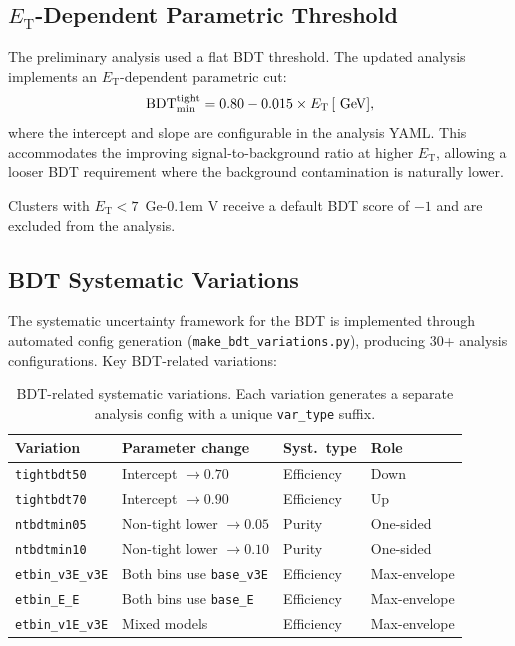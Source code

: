 \documentclass[11pt,a4paper]{article}
\newcommand{\ET}{\ensuremath{E_{\text{T}}}\xspace}
\newcommand{\GeV}{\ifmmode {\mathrm{\ Ge\kern -0.1em V}}\else\textrm{Ge\kern -0.1em V}\fi\xspace}
\begin{document}
\subsection{\ET-Dependent Parametric Threshold}
\label{subsec:bdt_threshold}

The preliminary analysis used a flat BDT threshold. The updated analysis
implements an \ET-dependent parametric cut:
\begin{equation}
    \text{BDT}_{\min}^{\text{tight}} = 0.80 - 0.015 \times \ET\,[\GeV],
    \label{eq:bdt_threshold}
\end{equation}
where the intercept and slope are configurable in the analysis YAML.
This accommodates the improving signal-to-background ratio at higher \ET,
allowing a looser BDT requirement where the background contamination is
naturally lower.

Clusters with $\ET < 7$~\GeV receive a default BDT score of $-1$ and are
excluded from the analysis.

\subsection{BDT Systematic Variations}
\label{subsec:bdt_syst}

The systematic uncertainty framework for the BDT is implemented through
automated config generation (\texttt{make\_bdt\_variations.py}), producing 30+
analysis configurations.  Key BDT-related variations:

\begin{table}[H]
    \centering
    \caption{BDT-related systematic variations. Each variation generates a
      separate analysis config with a unique \texttt{var\_type} suffix.}
    \label{tab:bdt_syst}
    \begin{tabular}{llll}
        \toprule
        Variation & Parameter change & Syst.\ type & Role \\
        \midrule
        \texttt{tightbdt50} & Intercept $\to 0.70$ & Efficiency & Down \\
        \texttt{tightbdt70} & Intercept $\to 0.90$ & Efficiency & Up \\
        \texttt{ntbdtmin05} & Non-tight lower $\to 0.05$ & Purity & One-sided \\
        \texttt{ntbdtmin10} & Non-tight lower $\to 0.10$ & Purity & One-sided \\
        \texttt{etbin\_v3E\_v3E} & Both bins use \texttt{base\_v3E} & Efficiency & Max-envelope \\
        \texttt{etbin\_E\_E} & Both bins use \texttt{base\_E} & Efficiency & Max-envelope \\
        \texttt{etbin\_v1E\_v3E} & Mixed models & Efficiency & Max-envelope \\
        \bottomrule
    \end{tabular}
\end{table}
\end{document}
